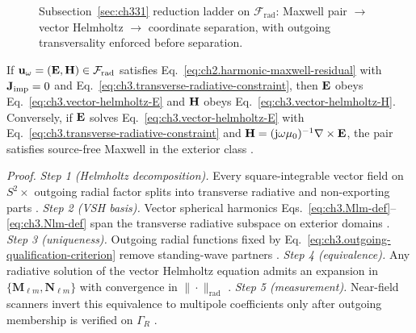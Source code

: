 \begin{figure}[t]
\centering
{}
\caption{Subsection~\ref{sec:ch331} reduction ladder on \(\mathcal{F}_{\mathrm{rad}}\): Maxwell pair
\(\to\) vector Helmholtz \(\to\) coordinate separation, with outgoing transversality enforced before separation.}
\label{fig:ch3.vector-helmholtz-ladder}
\end{figure}
\begin{theorem}
\label{thm:ch3.vector-helmholtz-equivalence}
If \(\mathbf{u}_\omega=(\mathbf{E},\mathbf{H})\in\mathcal{F}_{\mathrm{rad}}\) satisfies
Eq.~\eqref{eq:ch2.harmonic-maxwell-residual} with \(\mathbf{J}_{\mathrm{imp}}=0\) and
Eq.~\eqref{eq:ch3.transverse-radiative-constraint}, then \(\mathbf{E}\) obeys
Eq.~\eqref{eq:ch3.vector-helmholtz-E} and \(\mathbf{H}\) obeys Eq.~\eqref{eq:ch3.vector-helmholtz-H}. Conversely, if
\(\mathbf{E}\) solves Eq.~\eqref{eq:ch3.vector-helmholtz-E} with Eq.~\eqref{eq:ch3.transverse-radiative-constraint} and
\(\mathbf{H}=(\mathrm{j}\omega\mu_0)^{-1}\nabla\times\mathbf{E}\), the pair satisfies source-free Maxwell in the exterior class
\cite{stratton1941}.
\end{theorem}
\noindent\textit{Proof.}
\emph{Step 1 (Helmholtz decomposition).} Every square-integrable vector field on \(S^{2}\times\) outgoing radial factor splits into transverse radiative and non-exporting parts .
\emph{Step 2 (VSH basis).} Vector spherical harmonics Eqs.~\eqref{eq:ch3.Mlm-def}--\eqref{eq:ch3.Nlm-def} span the transverse radiative subspace on exterior domains .
\emph{Step 3 (uniqueness).} Outgoing radial functions fixed by Eq.~\eqref{eq:ch3.outgoing-qualification-criterion} remove standing-wave partners .
\emph{Step 4 (equivalence).} Any radiative solution of the vector Helmholtz equation admits an expansion in \(\{\mathbf{M}_{\ell m},\mathbf{N}_{\ell m}\}\) with convergence in \(\|\cdot\|_{\mathrm{rad}}\) .
\emph{Step 5 (measurement).} Near-field scanners invert this equivalence to multipole coefficients only after outgoing membership is verified on \(\Gamma_R\) .
